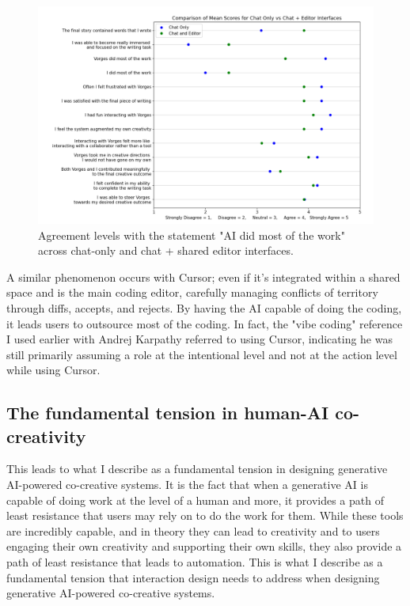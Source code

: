 \begin{figure}
    \centering
    \includegraphics[width=1\linewidth]{graphsharedspaces.png}
    \caption{Agreement levels with the statement "AI did most of the work" across chat-only and chat + shared editor interfaces.}
    \label{fig:graphsharedspaces}
\end{figure}

A similar phenomenon occurs with Cursor; even if it's integrated within a shared space and is the main coding editor, carefully managing conflicts of territory through diffs, accepts, and rejects. By having the AI capable of doing the coding, it leads users to outsource most of the coding. In fact, the "vibe coding" reference I used earlier with Andrej Karpathy referred to using Cursor, indicating he was still primarily assuming a role at the intentional level and not at the action level while using Cursor.


\subsection{The fundamental tension in human-AI co-creativity}

This leads to what I describe as a fundamental tension in designing generative AI-powered co-creative systems. It is the fact that when a generative AI is capable of doing work at the level of a human and more, it provides a path of least resistance that users may rely on to do the work for them. While these tools are incredibly capable, and in theory they can lead to creativity and to users engaging their own creativity and supporting their own skills, they also provide a path of least resistance that leads to automation. This is what I describe as a fundamental tension that interaction design needs to address when designing generative AI-powered co-creative systems.

